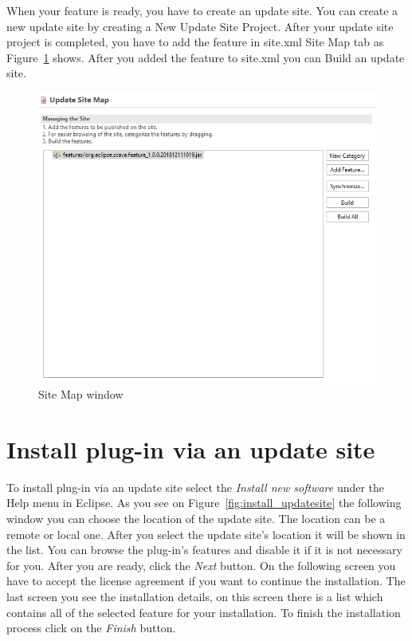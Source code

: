 \documentclass[11pt,a4paper]{book}
\begin{document}
When your feature is ready, you have to create an update site. You can create a new update site by creating a New Update Site Project. After your update site project is completed, you have to add the feature in site.xml Site Map tab as Figure~\ref{fig:update} shows. After you added the feature to site.xml you can Build an update site.


\begin{figure}[!h]
	\centering
	\includegraphics[width=\linewidth]{pic/update_site.png}
	\caption{Site Map window}
	\label{fig:update}
\end{figure}

\section{Install plug-in via an update site}

To install plug-in via an update site select the \textit{Install new software} under the Help menu in Eclipse. As you see on Figure~\ref{fig:install_updatesite} the following window you can choose the location of the update site. The location can be a remote or local one. After you select the update site's location it will be shown in the list. You can browse the plug-in's features and disable it if it is not necessary for you. After you are ready, click the \textit{Next} button. On the following screen you have to accept the license agreement if you want to continue the installation. The last screen you see the installation details, on this screen there is a list which contains all of the selected feature for your installation. To finish the installation process click on the \textit{Finish} button.
\end{document}
